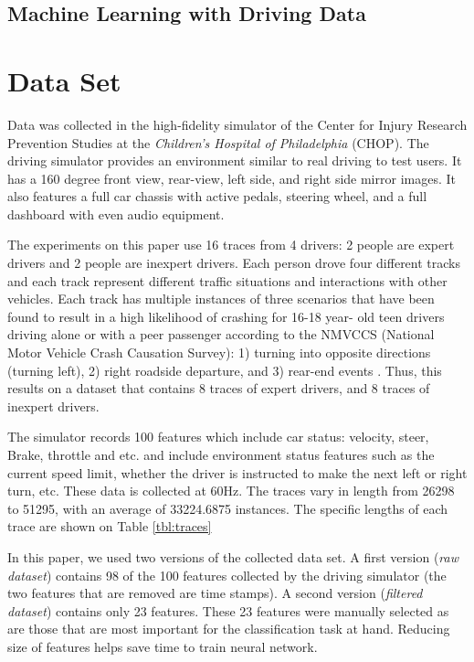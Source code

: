 \documentclass[draft,dvipsnames]{drexel-thesis}
\begin{document}
\begin{thesis}
\section{Machine Learning with Driving Data}\label{sec:MLDD}

\chapter{Data Set}

Data was collected in the high-fidelity simulator \cite{lee2017learning} of the Center for Injury Research Prevention Studies at the \textit{Children's Hospital of Philadelphia} (CHOP). The driving simulator provides an environment similar to real driving to test users. It has a 160 degree front view, rear-view, left side, and right side mirror images. It also features a full car chassis with active pedals, steering wheel, and a full dashboard with even audio equipment.

The experiments on this paper use 16 traces from 4 drivers: 2 people are expert drivers and 2 people are inexpert drivers. Each person drove four different tracks and each track represent different traffic situations and interactions with other vehicles. Each track has multiple instances of three scenarios that have been found to result in a high likelihood of crashing for 16-18 year- old teen drivers driving alone or with a peer passenger according to the NMVCCS (National Motor Vehicle Crash Causation Survey): 1) turning into opposite directions (turning left), 2) right roadside departure, and 3) rear-end events \cite{mcdonald2012using}. Thus, this results on a dataset that contains 8 traces of expert drivers, and 8 traces of inexpert drivers.

The simulator records 100 features which include car status: velocity, steer, Brake, throttle and etc. and include environment status features such as the current speed limit, whether the driver is instructed to make the next left or right turn, etc. These data is collected at 60Hz. The traces vary in length from 26298 to 51295, with an average of 33224.6875 instances. The specific lengths of each trace are shown on Table \ref{tbl:traces}

In this paper, we used two versions of the collected data set. A first version ({\em raw dataset}) contains 98 of the 100 features collected by the driving simulator (the two features that are removed are time stamps). A second version ({\em filtered dataset}) contains only 23 features. These 23 features were manually selected as are those that are most important for the classification task at hand. Reducing size of features helps save time to train neural network.


\end{thesis}
\end{document}
